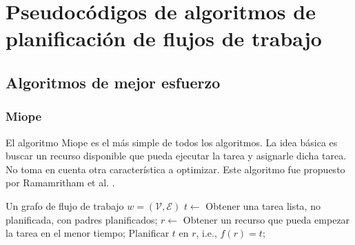 \chapter[Pseudocódigos]{Pseudocódigos de algoritmos de planificación de flujos de trabajo}

\section{Algoritmos de mejor esfuerzo}

\subsection{Miope}
\label{alg:myopic}
El algoritmo Miope \cite{yu2008workflow} es el más simple de todos los algoritmos. La idea básica es buscar un recurso disponible que pueda ejecutar la tarea y asignarle dicha tarea. No toma en cuenta otra característica a optimizar. Este algoritmo fue propuesto por Ramamritham et al. \cite{ramamritham1990efficient}. 
\\

\begin{algorithmic}[1]
\Require Un grafo de flujo de trabajo $w=(\mathcal{V}, \mathcal{E})$
	\State $t \gets$ Obtener una tarea lista, no planificada, con padres planificados;
	\State $r \gets$ Obtener un recurso que pueda empezar la tarea en el menor tiempo;
	\State Planificar $t$ en $r$, i.e., $f(r) = t$;
\EndWhile
\end{algorithmic}

